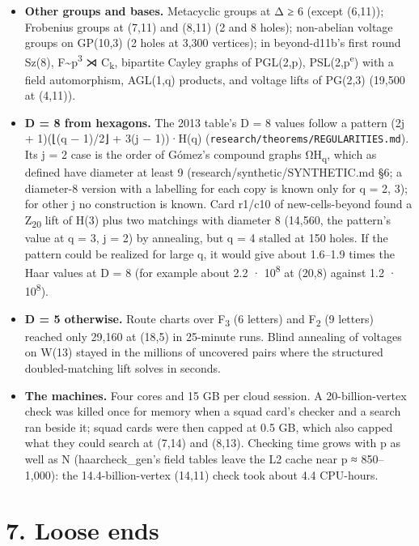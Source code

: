 \documentclass[
  10pt,
]{article}
\begin{document}
\begin{itemize}
\item
  \textbf{Other groups and bases.} Metacyclic groups at Δ ≥ 6 (except (6,11)); Frobenius groups at (7,11) and (8,11)
  (2 and 8 holes); non-abelian voltage groups on GP(10,3) (2 holes at 3,300 vertices); in beyond-d11b's first round
  Sz(8), F\textasciitilde p\textsuperscript{3} ⋊ C\textsubscript{k}, bipartite Cayley graphs of PGL(2,p),
  PSL(2,p\textsuperscript{e}) with a field automorphism, AGL(1,q) products, and voltage lifts of PG(2,3) (19,500 at
  (4,11)).
\item
  \textbf{D = 8 from hexagons.} The 2013 table's D = 8 values follow a pattern (2j + 1)(⌊(q − 1)/2⌋ + 3(j −
  1))·\textbar H(q)\textbar{} (\texttt{research/\allowbreak{}theorems/\allowbreak{}REGULARITIES.md}). Its j = 2 case is the order of Gómez's
  compound graphs ΩH\textsubscript{q}, which as defined have diameter at least 9 (research/synthetic/SYNTHETIC.md §6;
  a diameter-8 version with a labelling for each copy is known only for q = 2, 3); for other j no construction is
  known. Card r1/c10 of new-cells-beyond found a Z\textsubscript{20} lift of H(3) plus two matchings with diameter 8
  (14,560, the pattern's value at q = 3, j = 2) by annealing, but q = 4 stalled at 150 holes. If the pattern could be
  realized for large q, it would give about 1.6--1.9 times the Haar values at D = 8 (for example about 2.2 ·
  10\textsuperscript{8} at (20,8) against 1.2 · 10\textsuperscript{8}).
\item
  \textbf{D = 5 otherwise.} Route charts over F\textsubscript{3} (6 letters) and F\textsubscript{2} (9 letters)
  reached only 29,160 at (18,5) in 25-minute runs. Blind annealing of voltages on W(13) stayed in the millions of
  uncovered pairs where the structured doubled-matching lift solves in seconds.
\item
  \textbf{The machines.} Four cores and 15 GB per cloud session. A 20-billion-vertex check was killed once for memory
  when a squad card's checker and a search ran beside it; squad cards were then capped at 0.5 GB, which also capped
  what they could search at (7,14) and (8,13). Checking time grows with p as well as N (haarcheck\_gen's field tables
  leave the L2 cache near p ≈ 850--1,000): the 14.4-billion-vertex (14,11) check took about 4.4 CPU-hours.
\end{itemize}

\hypertarget{loose-ends}{%
\section{7. Loose ends}\label{loose-ends}}
\end{document}
